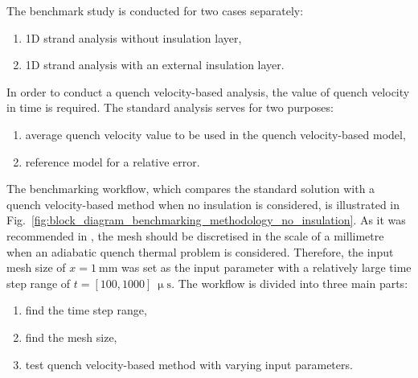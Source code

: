 The benchmark study is conducted for two cases separately: 
\begin{enumerate}
    \item 1D strand analysis without insulation layer,
    \item 1D strand analysis with an external insulation layer.
\end{enumerate}

In order to conduct a quench velocity-based analysis, the value of quench velocity in time is required. The standard analysis serves for two purposes:
\begin{enumerate}
    \item average quench velocity value to be used in the quench velocity-based model,
    \item reference model for a relative error.
\end{enumerate}

The benchmarking workflow, which compares the standard solution with a quench velocity-based method when no insulation is considered, is illustrated in Fig.~\ref{fig:block_diagram_benchmarking_methodology_no_insulation}. As it was recommended in \cite[p.~40]{paudel_thesis}, the mesh should be discretised in the scale of a millimetre when an adiabatic quench thermal problem is considered. Therefore, the input mesh size of $x=1~\text{mm}$ was set as the input parameter with a relatively large time step range of $t= [100, 1000]~\upmu \text{s}$. The workflow is divided into three main parts: 
\begin{enumerate}
    \item find the time step range,
    \item find the mesh size, 
    \item test quench velocity-based method with varying input parameters.
\end{enumerate}


